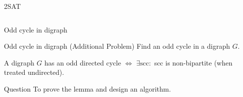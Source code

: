 \begin{frame}{2SAT}
  \begin{columns}
	  \pause
  \end{columns}
\end{frame}
\begin{frame}{Odd cycle in digraph}
  \begin{exampleblock}{Odd cycle in digraph (Additional Problem)}
    Find an odd cycle in a digraph $G$.
  \end{exampleblock}

  \pause
  \begin{lemma}
    A digraph $G$ has an odd directed cycle $\iff$ $\exists \text{scc}: $ scc is non-bipartite (when treated undirected).
  \end{lemma}

  \pause
  \begin{alertblock}{Question}
	To prove the lemma and design an algorithm.
  \end{alertblock}
\end{frame}
